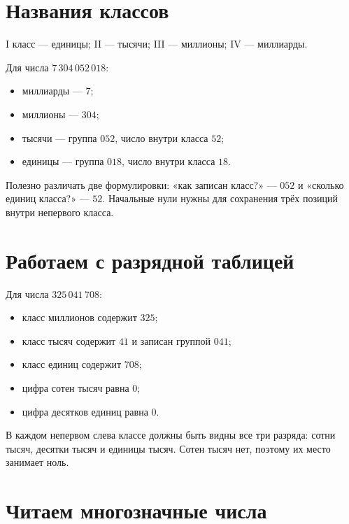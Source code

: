 \section{Названия классов}

I класс --- единицы; II --- тысячи; III --- миллионы; IV --- миллиарды.

\classtablefigure

Для числа \(7\,304\,052\,018\):
\begin{itemize}
  \item миллиарды --- \(7\);
  \item миллионы --- \(304\);
  \item тысячи --- группа \(052\), число внутри класса \(52\);
  \item единицы --- группа \(018\), число внутри класса \(18\).
\end{itemize}

\begin{teacherbox}
  Полезно различать две формулировки: «как записан класс?» --- \(052\) и
  «сколько единиц класса?» --- \(52\). Начальные нули нужны для сохранения
  трёх позиций внутри непервого класса.
\end{teacherbox}

\section{Работаем с разрядной таблицей}

\classworksheetfigure

Для числа \(325\,041\,708\):
\begin{itemize}
  \item класс миллионов содержит \(325\);
  \item класс тысяч содержит \(41\) и записан группой \(041\);
  \item класс единиц содержит \(708\);
  \item цифра сотен тысяч равна \(0\);
  \item цифра десятков единиц равна \(0\).
\end{itemize}

\begin{teacherbox}
  В каждом непервом слева классе должны быть видны все три разряда:
  сотни тысяч, десятки тысяч и единицы тысяч. Сотен тысяч нет, поэтому их
  место занимает ноль.
\end{teacherbox}

\section{Читаем многозначные числа}

